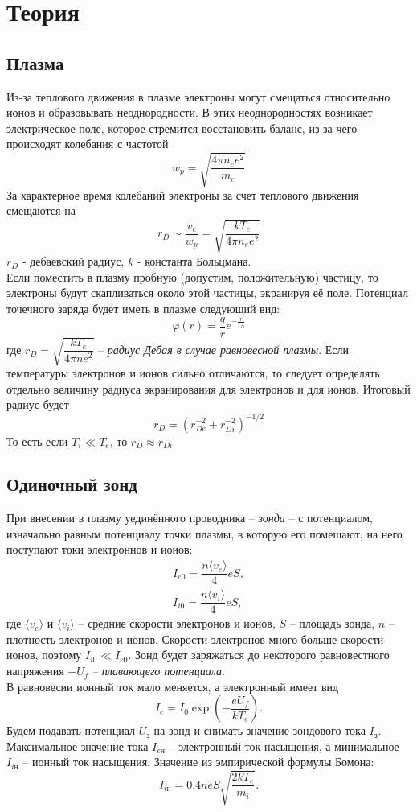 \documentclass[a4paper,12pt]{extarticle}
\begin{document}
\section*{Теория}
	\subsection*{Плазма}
	
	Из-за теплового движения в плазме электроны могут смещаться относительно ионов и образовывать неоднородности. В этих неоднородностях возникает электрическое поле, которое стремится восстановить баланс, из-за чего происходят колебания с частотой 
	\[w_p = \sqrt{\frac{4\pi n_e e^2}{m_e}}\]
	За характерное время колебаний электроны за счет теплового движения смещаются на 
	\[r_D \sim \frac{v_e}{w_p} = \sqrt{\frac{kT_e}{4\pi n_e e^2}}\]
	$r_D$ - дебаевский радиус, $k$ - константа Больцмана.\\
	Если поместить в плазму пробную (допустим, положительную) частицу, то электроны будут скапливаться около этой частицы, экранируя её поле. Потенциал точечного заряда будет иметь в плазме следующий вид:
	\[\varphi(r) = \frac{q}{r}e^{-\frac{r}{r_D}}\]
	где $r_D = \sqrt{\dfrac{kT_e}{4\pi n e^2}}$ -- \textit{радиус Дебая в случае равновесной плазмы}. Если температуры электронов и ионов сильно отличаются, то следует определять отдельно величину радиуса экранирования для электронов и для ионов. Итоговый радиус будет
	\[r_D = (r_{De}^{-2} + r_{Di}^{-2})^{-1/2}\]
	То есть если $T_i \ll T_e$, то $r_D \approx r_{Di}$ 
	\subsection*{Одиночный зонд}
	При внесении в плазму уединённого проводника -- \textit{зонда} -- с потенциалом, изначально равным потенциалу точки плазмы, в которую его помещают, на него поступают токи электроннов и ионов:
	\begin{equation}
		\begin{array}{c}
			I_{e0} = \dfrac{n \langle v_e \rangle}{4}eS,\\
			I_{i0} = \dfrac{n \langle v_i \rangle}{4}eS,
		\end{array}
	\end{equation}
	где $\langle v_e \rangle$ и $\langle v_i \rangle$ -- средние скорости электронов и ионов, $S$ -- площадь зонда, $n$ -- плотность электронов и ионов. Скорости электронов много больше скорости ионов, поэтому $I_{i0} \ll I_{e0}$. Зонд будет заряжаться до некоторого равновестного напряжения $-U_f$ -- \textit{плавающего потенциала}.\\
	В равновесии ионный ток мало меняется, а электронный имеет вид
	$$
	I_e = I_0 \exp\left( -\dfrac{eU_f}{kT_e} \right).
	$$
	Будем подавать потенциал $U_\text{з}$ на зонд и снимать значение зондового тока $I_\text{з}$. Максимальное значение тока $I_{e\text{н}}$ -- электронный ток насыщения, а минимальное $I_{i\text{н}}$ -- ионный ток насыщения. Значение из эмпирической формулы Бомона:
	\begin{equation}
		I_{i\text{н}} = 0.4 neS \sqrt{\dfrac{2kT_e}{m_i}}.
	\end{equation}
	
\end{document}
